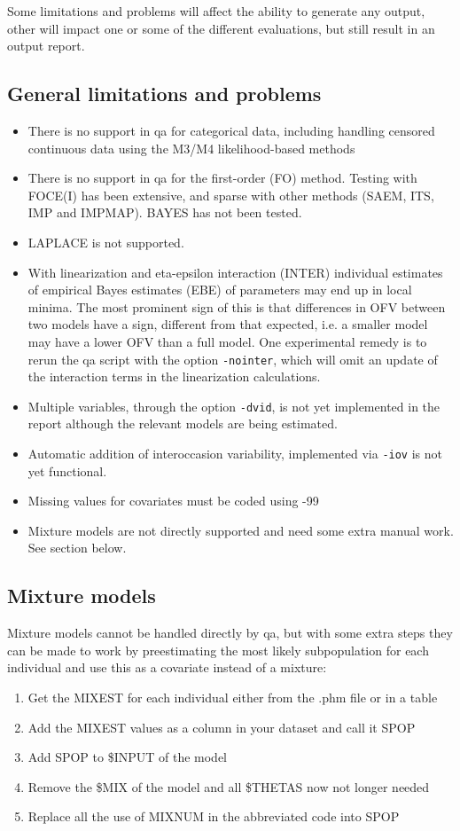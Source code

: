 Some limitations and problems will affect the ability to generate any output, other will impact one or some of the different evaluations, but still result in an output report. 

\subsection{General limitations and problems}
\begin{itemize}
	\item There is no support in qa for categorical data, including handling censored continuous data using the M3/M4 likelihood-based methods
	\item There is no support in qa for the first-order (FO) method. Testing with FOCE(I) has been extensive, and sparse with other methods (SAEM, ITS, IMP and IMPMAP). BAYES has not been tested. 
    \item LAPLACE is not supported.
	\item With linearization and eta-epsilon interaction (INTER) individual estimates of empirical Bayes estimates (EBE) of parameters may end up in local minima. The most prominent sign of this is that differences in OFV between two models have a sign, different from that expected, i.e. a smaller model may have a lower OFV than a full model. One experimental remedy is to rerun the qa script with the option \verb|-nointer|, which will omit an update of the interaction terms in the linearization calculations.
	\item Multiple variables, through the option \verb|-dvid|, is not yet implemented in the report although the relevant models are being estimated.
	\item Automatic addition of interoccasion variability, implemented via \verb|-iov| is not yet functional.
    \item Missing values for covariates must be coded using -99
    \item Mixture models are not directly supported and need some extra manual work. See section below.
\end{itemize}

\subsection{Mixture models}
Mixture models cannot be handled directly by qa, but with some extra steps they can be made to work by preestimating the most likely subpopulation for each individual and use this as a covariate instead of a mixture:
\begin{enumerate}
    \item Get the MIXEST for each individual either from the .phm file or in a table
    \item Add the MIXEST values as a column in your dataset and call it SPOP
    \item Add SPOP to \$INPUT of the model
    \item Remove the \$MIX of the model and all \$THETAS now not longer needed
    \item Replace all the use of MIXNUM in the abbreviated code into SPOP
\end{enumerate}


